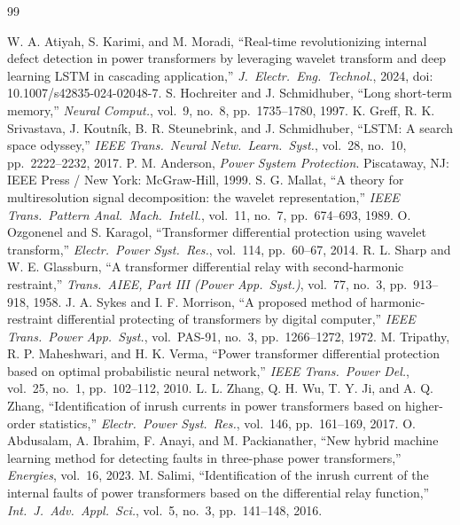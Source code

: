 \documentclass[12pt,a4paper,oneside]{report}
\begin{document}
\renewcommand{\bibname}{REFERENCES}
\begin{thebibliography}{99}
 W. A. Atiyah, S. Karimi, and M. Moradi, ``Real-time revolutionizing internal defect detection in power transformers by leveraging wavelet transform and deep learning LSTM in cascading application,'' \textit{J.\ Electr.\ Eng.\ Technol.}, 2024, doi: 10.1007/s42835-024-02048-7.
 S. Hochreiter and J. Schmidhuber, ``Long short-term memory,'' \textit{Neural Comput.}, vol.~9, no.~8, pp.~1735--1780, 1997.
 K. Greff, R. K. Srivastava, J. Koutn\'ik, B. R. Steunebrink, and J. Schmidhuber, ``LSTM: A search space odyssey,'' \textit{IEEE Trans.\ Neural Netw.\ Learn.\ Syst.}, vol.~28, no.~10, pp.~2222--2232, 2017.
 P. M. Anderson, \textit{Power System Protection}. Piscataway, NJ: IEEE Press / New York: McGraw-Hill, 1999.
 S. G. Mallat, ``A theory for multiresolution signal decomposition: the wavelet representation,'' \textit{IEEE Trans.\ Pattern Anal.\ Mach.\ Intell.}, vol.~11, no.~7, pp.~674--693, 1989.
 O. Ozgonenel and S. Karagol, ``Transformer differential protection using wavelet transform,'' \textit{Electr.\ Power Syst.\ Res.}, vol.~114, pp.~60--67, 2014.
 R. L. Sharp and W. E. Glassburn, ``A transformer differential relay with second-harmonic restraint,'' \textit{Trans.\ AIEE, Part III (Power App.\ Syst.)}, vol.~77, no.~3, pp.~913--918, 1958.
 J. A. Sykes and I. F. Morrison, ``A proposed method of harmonic-restraint differential protecting of transformers by digital computer,'' \textit{IEEE Trans.\ Power App.\ Syst.}, vol.~PAS-91, no.~3, pp.~1266--1272, 1972.
 M. Tripathy, R. P. Maheshwari, and H. K. Verma, ``Power transformer differential protection based on optimal probabilistic neural network,'' \textit{IEEE Trans.\ Power Del.}, vol.~25, no.~1, pp.~102--112, 2010.
 L. L. Zhang, Q. H. Wu, T. Y. Ji, and A. Q. Zhang, ``Identification of inrush currents in power transformers based on higher-order statistics,'' \textit{Electr.\ Power Syst.\ Res.}, vol.~146, pp.~161--169, 2017.
 O. Abdusalam, A. Ibrahim, F. Anayi, and M. Packianather, ``New hybrid machine learning method for detecting faults in three-phase power transformers,'' \textit{Energies}, vol.~16, 2023.
 M. Salimi, ``Identification of the inrush current of the internal faults of power transformers based on the differential relay function,'' \textit{Int.\ J.\ Adv.\ Appl.\ Sci.}, vol.~5, no.~3, pp.~141--148, 2016.

\end{thebibliography}
\end{document}
